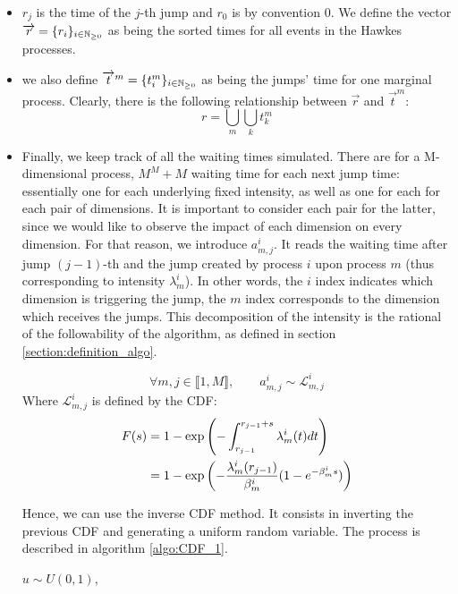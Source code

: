 \begin{itemize}
\item $r_j$ is the time of the $j$-th jump and $r_0$ is by convention $0$. We define the vector $\overrightarrow{r} = \{ r_i \}_{ i \in \mathbb{N}_{\geq 0}}$ as being the sorted times for all events in the Hawkes processes. 
\item we also define $\overrightarrow{t}^m = \{  t_i^m  \}_{ i \in \mathbb{N}_{\geq 0}} $ as being the jumps' time for one marginal process. Clearly, there is the following relationship between $\overrightarrow{r}$ and $\overrightarrow{t}^m $:
$$ r = \bigcup_m \bigcup_k  t_k^m $$
\item Finally, we keep track of all the waiting times simulated. There are for a M-dimensional process, $M^M + M$ waiting time for each next jump time: essentially one for each underlying fixed intensity, as well as one for each for each pair of dimensions. It is important to consider each pair for the latter, since we would like to observe the impact of each dimension on every dimension. For that reason, we introduce $a_{m,j}^i$. It reads the waiting time after jump $(j-1)$-th and the jump created by process $i$ upon process $m$ (thus corresponding to intensity $ \lambda^i_m$). In other words, the $i$ index indicates which dimension is triggering the jump, the $m$ index corresponds to the dimension which receives the jumps. This decomposition of the intensity is the rational of the followability of the algorithm, as defined in section \ref{section:definition_algo}.


\begin{remarque}
$$\forall m,j \in  \llbracket 1, M \rrbracket, \qquad a_{m,j}^i \sim \mathcal L_{m,j}^i   $$
Where $\mathcal L_{m,j}^i $ is defined by the CDF:
\begin{align}
F(s) &= 1 - \exp \left ( - \int_{r_{j-1}}^{r_{j-1} + s } \lambda_m^i (t) dt \right ) \notag \\
&= 1 - \exp \left ( - \frac { \lambda^i_m ( r_{j-1} ) } { \beta_m^i } ( 1 - e^{ - \beta_m^i s} ) \right )
\label{eq:L_defined}
\end{align}

Hence, we can use the inverse CDF method. It consists in inverting the previous CDF and generating a uniform random variable. The process is described in algorithm \ref{algo:CDF_1}.
\end{remarque}



\begin{algorithm}[H]
\label{algo:CDF_1}
\SetAlgoLined
$u \sim U(0,1)$,


\end{algorithm}
\end{itemize}
